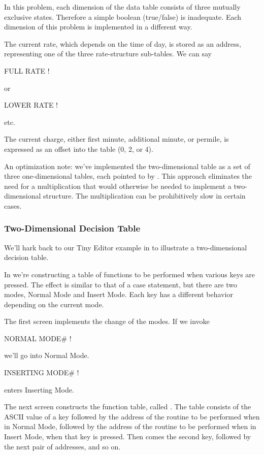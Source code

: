 In this problem, each dimension of the data table consists of three
mutually exclusive states. Therefore a simple boolean (true/false) is
inadequate. Each dimension of this problem is implemented in a different
way.

The current rate, which depends on the time of day, is stored as an
address, representing one of the three rate-structure sub-tables. We can
say
\begin{Code}
FULL RATE !
\end{Code}
or
\begin{Code}
LOWER RATE !
\end{Code}
etc.\goodbreak

The current charge, either first minute, additional minute, or permile,
is expressed as an offset into the table (0, 2, or 4).

An optimization note: we've implemented the two-dimensional table
as a set of three one-dimensional tables, each pointed to by . This
approach eliminates the need for a multiplication that would otherwise be
needed to implement a two-dimensional structure. The multiplication can
be prohibitively slow in certain cases.

\subsubsection{Two-Dimensional Decision Table}

We'll hark back to our Tiny Editor example in  to illustrate
a two-dimensional decision table.

In  we're constructing a table of functions to be performed
when various keys are pressed. The effect is similar to that of a
case statement, but there are two modes, Normal Mode and Insert Mode.
Each key has a different behavior depending on the current mode.

The first screen implements the change of the modes. If we invoke

\begin{Code}
NORMAL MODE# !
\end{Code}
we'll go into Normal Mode.

\begin{Code}
INSERTING MODE# !
\end{Code}
enters Inserting Mode.

The next screen constructs the function table, called .
The table consists of the ASCII value of a key followed by the address of
the routine to be performed when in Normal Mode, followed by the address
of the routine to be performed when in Insert Mode, when that key
is pressed. Then comes the second key, followed by the next pair of
addresses, and so on.

